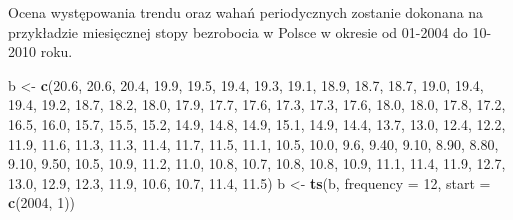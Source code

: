 \documentclass[polish,]{book}
\newenvironment{Shaded}{\begin{snugshade}}{\end{snugshade}}
\newcommand{\DataTypeTok}[1]{\textcolor[rgb]{0.13,0.29,0.53}{#1}}
\newcommand{\DecValTok}[1]{\textcolor[rgb]{0.00,0.00,0.81}{#1}}
\newcommand{\FloatTok}[1]{\textcolor[rgb]{0.00,0.00,0.81}{#1}}
\newcommand{\KeywordTok}[1]{\textcolor[rgb]{0.13,0.29,0.53}{\textbf{#1}}}
\newcommand{\NormalTok}[1]{#1}
\newcommand{\StringTok}[1]{\textcolor[rgb]{0.31,0.60,0.02}{#1}}
\begin{document}
Ocena występowania trendu oraz wahań periodycznych zostanie dokonana na przykładzie miesięcznej stopy bezrobocia w Polsce w okresie od 01-2004 do 10-2010 roku.

\begin{Shaded}
\begin{Highlighting}[]
\NormalTok{b <-}\StringTok{ }\KeywordTok{c}\NormalTok{(}\FloatTok{20.6}\NormalTok{, }\FloatTok{20.6}\NormalTok{, }\FloatTok{20.4}\NormalTok{, }\FloatTok{19.9}\NormalTok{, }\FloatTok{19.5}\NormalTok{, }\FloatTok{19.4}\NormalTok{, }\FloatTok{19.3}\NormalTok{, }\FloatTok{19.1}\NormalTok{, }\FloatTok{18.9}\NormalTok{, }\FloatTok{18.7}\NormalTok{, }\FloatTok{18.7}\NormalTok{, }\FloatTok{19.0}\NormalTok{, }\FloatTok{19.4}\NormalTok{, }\FloatTok{19.4}\NormalTok{, }
       \FloatTok{19.2}\NormalTok{, }\FloatTok{18.7}\NormalTok{, }\FloatTok{18.2}\NormalTok{, }\FloatTok{18.0}\NormalTok{, }\FloatTok{17.9}\NormalTok{, }\FloatTok{17.7}\NormalTok{, }\FloatTok{17.6}\NormalTok{, }\FloatTok{17.3}\NormalTok{, }\FloatTok{17.3}\NormalTok{, }\FloatTok{17.6}\NormalTok{, }\FloatTok{18.0}\NormalTok{, }\FloatTok{18.0}\NormalTok{, }\FloatTok{17.8}\NormalTok{, }\FloatTok{17.2}\NormalTok{,}
       \FloatTok{16.5}\NormalTok{, }\FloatTok{16.0}\NormalTok{, }\FloatTok{15.7}\NormalTok{, }\FloatTok{15.5}\NormalTok{, }\FloatTok{15.2}\NormalTok{, }\FloatTok{14.9}\NormalTok{, }\FloatTok{14.8}\NormalTok{, }\FloatTok{14.9}\NormalTok{, }\FloatTok{15.1}\NormalTok{, }\FloatTok{14.9}\NormalTok{, }\FloatTok{14.4}\NormalTok{, }\FloatTok{13.7}\NormalTok{, }\FloatTok{13.0}\NormalTok{, }\FloatTok{12.4}\NormalTok{,}
       \FloatTok{12.2}\NormalTok{, }\FloatTok{11.9}\NormalTok{, }\FloatTok{11.6}\NormalTok{, }\FloatTok{11.3}\NormalTok{, }\FloatTok{11.3}\NormalTok{, }\FloatTok{11.4}\NormalTok{, }\FloatTok{11.7}\NormalTok{, }\FloatTok{11.5}\NormalTok{, }\FloatTok{11.1}\NormalTok{, }\FloatTok{10.5}\NormalTok{, }\FloatTok{10.0}\NormalTok{, }\FloatTok{9.6}\NormalTok{,  }\FloatTok{9.40}\NormalTok{, }\FloatTok{9.10}\NormalTok{,}
       \FloatTok{8.90}\NormalTok{, }\FloatTok{8.80}\NormalTok{, }\FloatTok{9.10}\NormalTok{, }\FloatTok{9.50}\NormalTok{, }\FloatTok{10.5}\NormalTok{, }\FloatTok{10.9}\NormalTok{, }\FloatTok{11.2}\NormalTok{, }\FloatTok{11.0}\NormalTok{, }\FloatTok{10.8}\NormalTok{, }\FloatTok{10.7}\NormalTok{, }\FloatTok{10.8}\NormalTok{, }\FloatTok{10.8}\NormalTok{, }\FloatTok{10.9}\NormalTok{, }\FloatTok{11.1}\NormalTok{,}
       \FloatTok{11.4}\NormalTok{, }\FloatTok{11.9}\NormalTok{, }\FloatTok{12.7}\NormalTok{, }\FloatTok{13.0}\NormalTok{, }\FloatTok{12.9}\NormalTok{, }\FloatTok{12.3}\NormalTok{, }\FloatTok{11.9}\NormalTok{, }\FloatTok{10.6}\NormalTok{, }\FloatTok{10.7}\NormalTok{, }\FloatTok{11.4}\NormalTok{, }\FloatTok{11.5}\NormalTok{)}
\NormalTok{b <-}\StringTok{ }\KeywordTok{ts}\NormalTok{(b, }\DataTypeTok{frequency =} \DecValTok{12}\NormalTok{, }\DataTypeTok{start =} \KeywordTok{c}\NormalTok{(}\DecValTok{2004}\NormalTok{, }\DecValTok{1}\NormalTok{))}
\end{Highlighting}
\end{Shaded}
\end{document}
